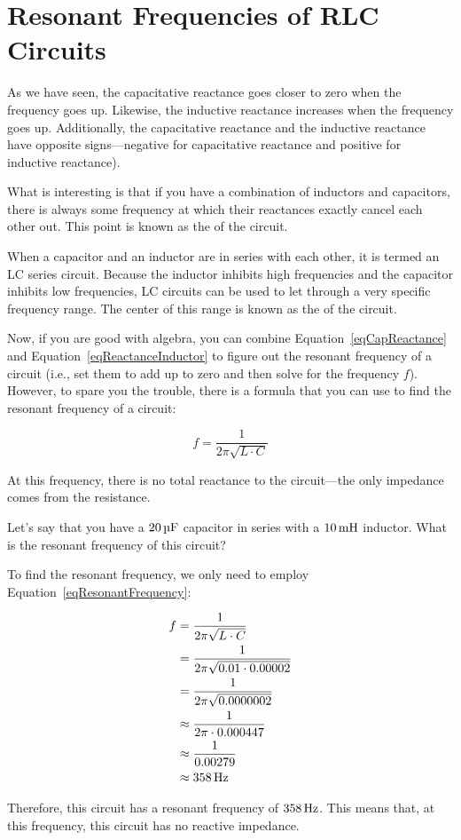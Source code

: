 \section{Resonant Frequencies of RLC Circuits}

As we have seen, the capacitative reactance goes closer to zero when the frequency goes up.
Likewise, the inductive reactance increases when the frequency goes up.
Additionally, the capacitative reactance and the inductive reactance have opposite signs---negative for capacitative reactance and positive for inductive reactance).

What is interesting is that if you have a combination of inductors and capacitors, there is always some frequency at which their reactances exactly cancel each other out.
This point is known as the  of the circuit.

When a capacitor and an inductor are in series with each other, it is termed an LC series circuit.
Because the inductor inhibits high frequencies and the capacitor inhibits low frequencies, LC circuits can be used to let through a very specific frequency range.
The center of this range is known as the  of the circuit.

Now, if you are good with algebra, you can combine Equation~\ref{eqCapReactance} and Equation~\ref{eqReactanceInductor} to figure out the resonant frequency of a circuit (i.e., set them to add up to zero and then solve for the frequency $f$).
However, to spare you the trouble, there is a formula that you can use to find the resonant frequency of a circuit:

\begin{equation}
\label{eqResonantFrequency}
f = \frac{1}{2\pi\sqrt{L\cdot C}}
\end{equation}

At this frequency, there is no total reactance to the circuit---the only impedance comes from the resistance.

\begin{exampleprob}
Let's say that you have a $20\,\si{\micro\farad}$ capacitor in series with a $10\mymhy$ inductor.
What is the resonant frequency of this circuit?

To find the resonant frequency, we only need to employ Equation~\ref{eqResonantFrequency}:

\begin{align*}
f &= \frac{1}{2\pi\sqrt{L\cdot C}} \\
  &= \frac{1}{2\pi\sqrt{0.01 \cdot 0.00002}} \\
  &= \frac{1}{2\pi\sqrt{0.0000002}} \\
  &\approx \frac{1}{2\pi\cdot 0.000447} \\
  &\approx \frac{1}{0.00279} \\
  &\approx 358\,\si{\hertz}
\end{align*}

Therefore, this circuit has a resonant frequency of $358\,\si{\hertz}$.  
This means that, at this frequency, this circuit has no reactive impedance.
\end{exampleprob}


